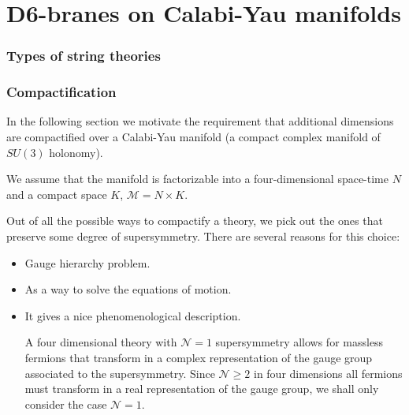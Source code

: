 \chapter{D6-branes on Calabi-Yau manifolds}

\subsection{Types of string theories}


\subsection{Compactification}

In the following section we motivate the requirement that additional dimensions are compactified
over a Calabi-Yau manifold (a compact complex manifold of $SU(3)$ holonomy).



We assume that the manifold is factorizable into a four-dimensional space-time $N$ and a compact space $K$,
$\mathcal M =  N\times K$.


Out of all the possible ways to compactify a theory, we pick out the ones that preserve some
degree of supersymmetry.
There are several reasons for this choice:
\begin{itemize}
  \item Gauge hierarchy problem.
  \item As a way to solve the equations of motion.
  \item It gives a nice phenomenological description.

    A four dimensional theory with $\mathcal N=1$ supersymmetry allows for massless fermions
    that transform in a complex representation of the gauge group associated to the supersymmetry.
    Since $\mathcal N\geq 2$ in four dimensions all fermions must transform in a real representation 
    of the gauge group, we shall only consider the case $\mathcal N=1$.

\end{itemize}

